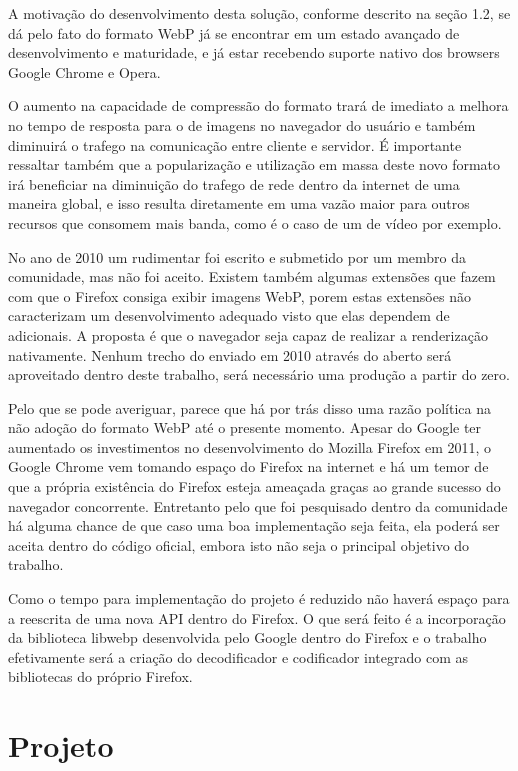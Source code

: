 \documentclass[espaco=simples,appendix=Name]{abnt}
\begin{document}
A motivação do desenvolvimento desta solução, conforme descrito na seção 1.2, se dá pelo fato do formato WebP já se encontrar em um estado avançado de desenvolvimento e maturidade, e já estar recebendo suporte nativo dos browsers Google Chrome e Opera. 

O aumento na capacidade de compressão do formato  trará de imediato a melhora no tempo de resposta para o  de imagens no navegador do usuário e também diminuirá o trafego na comunicação entre cliente e servidor. É importante ressaltar também que a popularização e utilização em massa deste novo formato irá beneficiar na diminuição do trafego de rede dentro da internet de uma maneira global, e isso resulta diretamente em uma vazão maior para outros recursos que consomem mais banda, como é o caso de um  de vídeo por exemplo.

No ano de 2010 um  rudimentar foi escrito e submetido por um membro da comunidade, mas não foi aceito. Existem também algumas extensões que fazem com que o Firefox consiga exibir imagens WebP, porem estas extensões não caracterizam um desenvolvimento adequado visto que elas dependem de  adicionais. A proposta é que o navegador seja capaz de realizar a renderização nativamente. Nenhum trecho do  enviado em 2010 através do  aberto será aproveitado dentro deste trabalho, será necessário uma produção a partir do zero.

Pelo que se pode averiguar, parece que há por trás disso uma razão política na não adoção do formato WebP até o presente momento. Apesar do Google ter aumentado os investimentos no desenvolvimento do Mozilla Firefox em 2011, o Google Chrome vem tomando espaço do Firefox na internet e há um temor de que a própria existência do Firefox esteja ameaçada graças ao grande sucesso do navegador concorrente. Entretanto pelo que foi pesquisado dentro da comunidade há alguma chance de que caso uma boa implementação seja feita, ela poderá ser aceita dentro do código oficial, embora isto não seja o principal objetivo do trabalho.

Como o tempo para implementação do projeto é reduzido não haverá espaço para a reescrita de uma nova API dentro do Firefox. O que será feito é a incorporação da biblioteca libwebp desenvolvida pelo Google dentro do Firefox e o trabalho efetivamente será a criação do decodificador e codificador integrado com as bibliotecas do próprio Firefox.

\section{Projeto}
\end{document}
